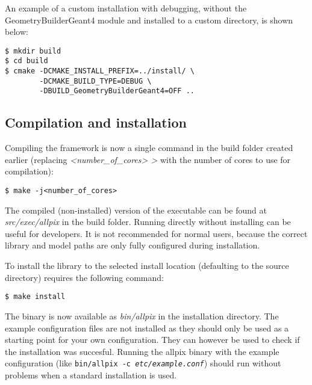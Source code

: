 An example of a custom installation with debugging, without the GeometryBuilderGeant4 module and installed to a custom directory, is shown below:
\begin{verbatim}
$ mkdir build
$ cd build
$ cmake -DCMAKE_INSTALL_PREFIX=../install/ \
        -DCMAKE_BUILD_TYPE=DEBUG \
        -DBUILD_GeometryBuilderGeant4=OFF ..
\end{verbatim}

\subsection{Compilation and installation}
Compiling the framework is now a single command in the build folder created earlier (replacing \textit{\textless number\_of\_cores> \textgreater} with the number of cores to use for compilation):
\begin{verbatim}
$ make -j<number_of_cores>
\end{verbatim}
The compiled (non-installed) version of the executable can be found at \textit{src/exec/allpix} in the build folder. Running \apsq directly without installing can be useful for developers. It is not recommended for normal users, because the correct library and model paths are only fully configured during installation.

To install the library to the selected install location (defaulting to the source directory) requires the following command:
\begin{verbatim}
$ make install
\end{verbatim}

The binary is now available as \textit{bin/allpix} in the installation directory. The example configuration files are not installed as they should only be used as a starting point for your own configuration. They can however be used to check if the installation was succesful. Running the allpix binary with the example configuration (like \texttt{bin/allpix -c \textit{etc/example.conf}}) should run without problems when a standard installation is used.
